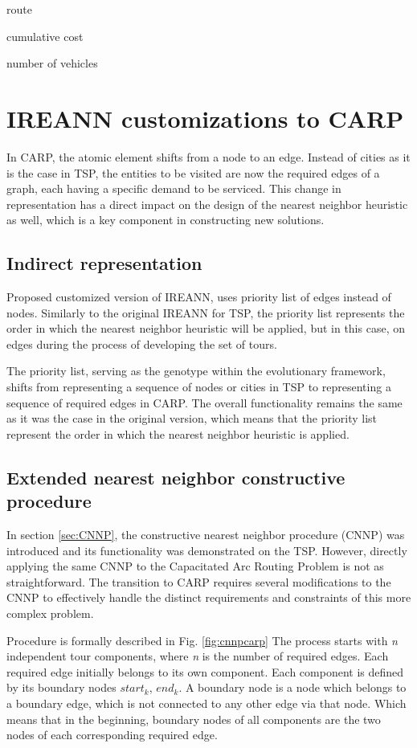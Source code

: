 \documentclass[twoside]{ctuthesis}
\theoremstyle{plain}
\theoremstyle{definition}
\theoremstyle{note}
\begin{document}
route

cumulative cost

number of vehicles


\section{IREANN customizations to CARP}
In CARP, the atomic element shifts from a node to an edge. Instead of cities as it is the case in TSP, the entities to be visited are now the required edges of a graph, each having a specific demand to be serviced. This change in representation has a direct impact on the design of the nearest neighbor heuristic as well, which is a key component in constructing new solutions.

\subsection{Indirect representation}
\label{sec:indirectcarp}
Proposed customized version of IREANN, uses priority list of edges instead of nodes. Similarly to the original IREANN \cite{kubalik2014novel} for TSP, the priority list represents the order in which the nearest neighbor heuristic will be applied, but in this case, on edges during the process of developing the set of tours.

The priority list, serving as the genotype within the evolutionary framework, shifts from representing a sequence of nodes or cities in TSP to representing a sequence of required edges in CARP. The overall functionality remains the same as it was the case in the original version, which means that the priority list represent the order in which the nearest neighbor heuristic is applied.

\subsection{Extended nearest neighbor constructive procedure}
\label{sec:CNNPCARP}
In section \ref{sec:CNNP}, the constructive nearest neighbor procedure (CNNP) was introduced and its functionality was demonstrated on the TSP. However, directly applying the same CNNP to the Capacitated Arc Routing Problem is not as straightforward. The transition to CARP requires several modifications to the CNNP to effectively handle the distinct requirements and constraints of this more complex problem.

Procedure is formally described in Fig. \ref{fig:cnnpcarp}
The process starts with \emph{n} independent tour components, where \emph{n} is the number of required edges. Each required edge initially belongs to its own component. Each component is defined by its boundary nodes {\emph{$start_k$}, \emph{$end_k$}}. A boundary node is a node which belongs to a boundary edge, which is not connected to any other edge via that node. Which means that in the beginning, boundary nodes of all components are the two nodes of each corresponding required edge. 
\end{document}
